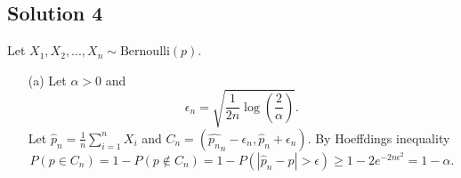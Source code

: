 \subsection*{Solution 4}

Let $X_1, X_2, ..., X_n \sim \mathrm{Bernoulli}(p)$.

\begin{itemize}
\item[(a)] Let $\alpha > 0$ and
\begin{equation*}
\epsilon_n = \sqrt{\frac{1}{2n} \log\left(\frac{2}{\alpha}\right)}.
\end{equation*}
Let $\hat{p}_n = \frac{1}{n}\sum_{i=1}^n X_i$ and $C_n = (\hat{p_n}_n - \epsilon_n, \hat{p}_n + \epsilon_n)$.
By Hoeffdings inequality
\begin{equation*}
P(p \in C_n) = 1 - P(p \notin C_n)
    = 1 - P(|\hat{p}_n - p| > \epsilon)
    \geq 1 - 2e^{-2n\epsilon^2}
    = 1 - \alpha.
\end{equation*}
\end{itemize}
